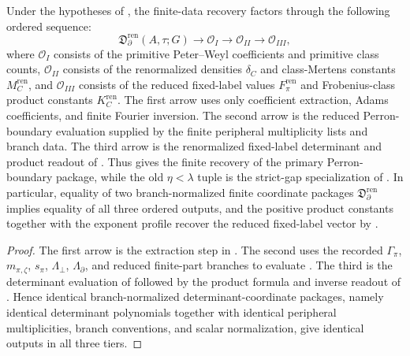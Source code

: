 \begin{remark}
  \label{prop:assembled-recovery-dependency-order}
  \label{rem:assembled-recovery-dependency-order}
  Under the hypotheses of , the
  finite-data recovery factors through the following ordered sequence:
  \begin{equation}\label{eq:assembled-recovery-dependency-order}
    \mathfrak D_{\partial}^{\mathrm{ren}}(A,\tau;G)
    \longrightarrow
    \mathcal O_I
    \longrightarrow
    \mathcal O_{II}
    \longrightarrow
    \mathcal O_{III},
  \end{equation}
  where \(\mathcal O_I\) consists of the primitive Peter--Weyl coefficients
  and primitive class counts, \(\mathcal O_{II}\) consists of the
  renormalized densities \(\delta_C\) and class-Mertens constants
  \(M_C^{\mathrm{ren}}\), and \(\mathcal O_{III}\) consists of the reduced
  fixed-label values \(F_\pi^{\mathrm{ren}}\) and Frobenius-class product
  constants \(K_C^{\mathrm{ren}}\).  The first arrow uses only coefficient
  extraction, Adams coefficients, and finite Fourier inversion.  The second
  arrow is the reduced Perron-boundary evaluation supplied by the finite
  peripheral multiplicity lists and branch data.  The third arrow is the
  renormalized
  fixed-label determinant and product readout of
  .
  Thus  gives the finite recovery
  of the primary Perron-boundary package, while the old \(\eta<\lambda\)
  tuple is the strict-gap specialization of
  .
  In particular, equality of two branch-normalized finite coordinate packages
  \(\mathfrak D_{\partial}^{\mathrm{ren}}\) implies equality of all three
  ordered outputs, and the positive product constants together with the
  exponent profile recover the reduced fixed-label vector by
  .
\end{remark}

\begin{proof}
  The first arrow is the extraction step in
  .  The second uses the recorded
  \(\Gamma_\pi\), \(m_{\pi,\zeta}\), \(s_\pi\),
  \(\Lambda_\perp\), \(\Lambda_\partial\), and reduced finite-part branches
  to evaluate
  .  The third is the determinant
  evaluation of  followed by
  the product formula and inverse readout of
  .
  Hence identical branch-normalized determinant-coordinate packages, namely
  identical determinant polynomials together with identical peripheral
  multiplicities, branch conventions, and scalar normalization, give identical
  outputs in all three tiers.
\end{proof}

